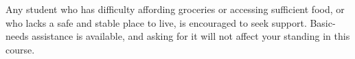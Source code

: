 Any student who has difficulty affording groceries or accessing sufficient food,
or who lacks a safe and stable place to live, is encouraged to seek support.
Basic-needs assistance is available, and asking for it will not affect your
standing in this course.
